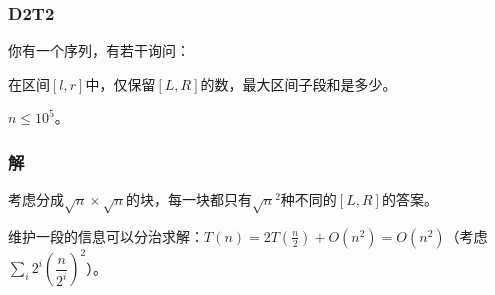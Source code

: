 \documentclass[10pt]{beamer}
\begin{document}
	\begin{frame}
		\frametitle{D2T2}
	
		你有一个序列，有若干询问：

		在区间$[l,r]$中，仅保留$[L,R]$的数，最大区间子段和是多少。

		$n\le 10^5$。
	
	\end{frame}
	\begin{frame}
		\frametitle{解}
	
		考虑分成$\sqrt n\times \sqrt n$的块，每一块都只有$\sqrt n^2$种不同的$[L,R]$的答案。

		维护一段的信息可以分治求解：$T(n)=2T(\frac n2)+O(n^2)=O(n^2)$（考虑$\sum_i 2^i(\dfrac{n}{2^i})^2$）。
	
	\end{frame}
\end{document}
